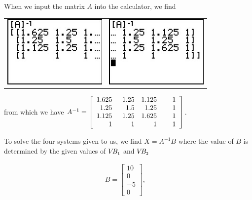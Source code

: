 \documentclass{ximera}
\begin{document}
\begin{ex}
When we input the matrix $A$ into the calculator, we find

\begin{center}

\begin{tabular}{cc}

\includegraphics[width=2in]{./MatMethodsGraphics/MATRIXINVERSE01.jpg} &

\hspace{0.75in} \includegraphics[width=2in]{./MatMethodsGraphics/MATRIXINVERSE02.jpg}  \\

\end{tabular}

\end{center}

from which we have  $A^{-1} = \left[ \begin{array}{rrrr} 1.625 & \hphantom{2}1.25 & 1.125 & \hphantom{2.2}1  \\ 1.25 & 1.5 & 1.25 & 1 \\ 1.125 & 1.25 & 1.625 & 1 \\ 1 & 1 & 1 & 1 \end{array} \right]$. 

To solve the four systems given to us, we find $X=A^{-1}B$ where the value of $B$ is determined by the given values of $V\!B_{\mbox{\tiny$1$}}$ and $V\!B_{\mbox{\tiny$2$}}$

\[\begin{array}{cccc}

 B = \left[ \begin{array}{r} 10 \\ 0 \\ -5 \\ 0 \end{array} \right], & 


\end{array}\]
\end{ex}
\end{document}

